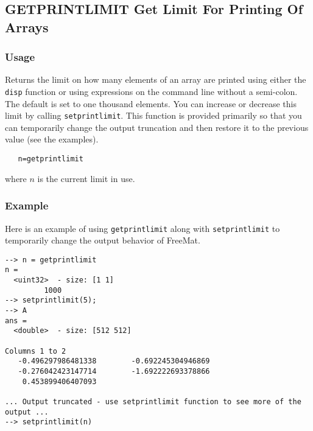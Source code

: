 %
%
%
\subsection{GETPRINTLIMIT Get Limit For Printing Of Arrays}
\subsubsection{Usage}
Returns the limit on how many elements of an array are printed
using either the \verb|disp| function or using expressions on the
command line without a semi-colon.  The default is set to 
one thousand elements.  You can increase or decrease this
limit by calling \verb|setprintlimit|.  This function is provided
primarily so that you can temporarily change the output truncation
and then restore it to the previous value (see the examples).
\begin{verbatim}
   n=getprintlimit
\end{verbatim}
where $n$ is the current limit in use.
\subsubsection{Example}
Here is an example of using \verb|getprintlimit| along with \verb|setprintlimit| to temporarily change the output behavior of FreeMat.
\begin{verbatim}
--> n = getprintlimit
n =
  <uint32>  - size: [1 1]
         1000
--> setprintlimit(5);
--> A
ans =
  <double>  - size: [512 512]
  
Columns 1 to 2
   -0.496297986481338        -0.692245304946869
   -0.276042423147714        -1.692222693378866
    0.453899406407093
 
... Output truncated - use setprintlimit function to see more of the output ...
--> setprintlimit(n)
\end{verbatim}

